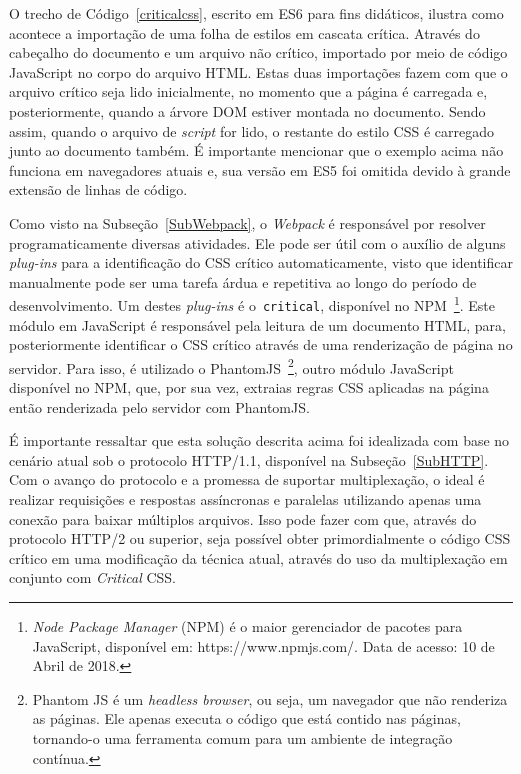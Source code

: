 O trecho de Código~\ref{criticalcss}, escrito em ES6 para fins didáticos, ilustra como acontece a importação de uma folha de estilos em cascata crítica. Através do cabeçalho do documento e um arquivo não crítico, importado por meio de código JavaScript no corpo do arquivo HTML. Estas duas importações fazem com que o arquivo crítico seja lido inicialmente, no momento que a página é carregada e, posteriormente, quando a árvore DOM estiver montada no documento. Sendo assim, quando o arquivo de \textit{script} for lido, o restante do estilo CSS é carregado junto ao documento também. É importante mencionar que o exemplo acima não funciona em navegadores atuais e, sua versão em ES5 foi omitida devido à grande extensão de linhas de código.

Como visto na Subseção~\ref{SubWebpack}, o \textit{Webpack} é responsável por resolver programaticamente diversas atividades. Ele pode ser útil com o auxílio de alguns \textit{plug-ins} para a identificação do CSS crítico automaticamente, visto que identificar manualmente pode ser uma tarefa árdua e repetitiva ao longo do período de desenvolvimento. Um destes \textit{plug-ins} é o~\texttt{critical}, disponível no NPM~\footnote{\textit{Node Package Manager} (NPM) é o maior gerenciador de pacotes para JavaScript, disponível em: https://www.npmjs.com/. Data de acesso: 10 de Abril de 2018.}. Este módulo em JavaScript é responsável pela leitura de um documento HTML, para, posteriormente identificar o CSS crítico através de uma renderização de página no servidor. Para isso, é utilizado o PhantomJS~\footnote{Phantom JS é um \textit{headless browser}, ou seja, um navegador que não renderiza as páginas. Ele apenas executa o código que está contido nas páginas, tornando-o uma ferramenta comum para um ambiente de integração contínua.}, outro módulo JavaScript disponível no NPM, que, por sua vez, extraias regras CSS aplicadas na página então renderizada pelo servidor com PhantomJS.

É importante ressaltar que esta solução descrita acima foi idealizada com base no cenário atual sob o protocolo HTTP/1.1, disponível na Subseção~\ref{SubHTTP}. Com o avanço do protocolo e a promessa de suportar multiplexação, o ideal é realizar requisições e respostas assíncronas e paralelas utilizando apenas uma conexão para baixar múltiplos arquivos. Isso pode fazer com que, através do protocolo HTTP/2 ou superior, seja possível obter primordialmente o código CSS crítico em uma modificação da técnica atual, através do uso da multiplexação em conjunto com \textit{Critical} CSS.

